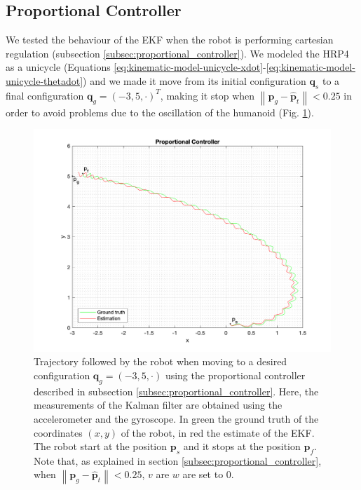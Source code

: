 \documentclass[a4paper]{article}
\begin{document}
\subsection{Proportional Controller}
We tested the behaviour of the EKF when the robot is
performing cartesian regulation (subsection \ref{subsec:proportional_controller}).
We modeled the HRP4 as a unicycle (Equations
\ref{eq:kinematic-model-unicycle-xdot}-\ref{eq:kinematic-model-unicycle-thetadot})
and we made it move from its initial
configuration $\bm{q}_s$ to a final configuration $\bm{q}_g = (-3, 5, \cdot)^T$,
making it stop when $\left\|\bm{p}_g - \bm{\hat{p}}_t \right\| < 0.25$
in order to avoid problems due to
the oscillation of the humanoid (Fig. \ref{fig:proportional_controller_xy}).
\begin{figure}
    \centering
    \includegraphics[width=\textwidth]{images/proportional_controller.png}
    \caption{Trajectory followed by the robot when moving to a desired configuration
        $\bm{q}_g = (-3, 5, \cdot)$ using the proportional controller
        described in subsection \ref{subsec:proportional_controller}.
        Here, the measurements of the Kalman filter are obtained
        using the accelerometer and the gyroscope. In green the ground truth of the coordinates $(x, y)$ of the
        robot, in red the estimate of the EKF. The robot start at the
        position $\bm{p}_s$ and it stops at the position $\bm{p}_f$. Note that,
        as explained in section \ref{subsec:proportional_controller},
        when $\left\|\bm{p}_g - \bm{\hat{p}}_t \right\| < 0.25$, $v$ are $w$ are set to 0.}
    \label{fig:proportional_controller_xy}
\end{figure}
\end{document}
